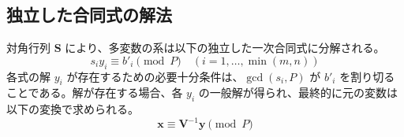 \documentclass[a4paper,11pt,dvipdfmx]{jsarticle}
\theoremstyle{definition}
\begin{document}
\subsection{独立した合同式の解法}
対角行列 $\mathbf{S}$ により、多変数の系は以下の独立した一次合同式に分解される。
\begin{equation}
    s_i y_i \equiv b'_i \pmod{P} \quad (i = 1, \dots, \min(m, n))
\end{equation}
各式の解 $y_i$ が存在するための必要十分条件は、$\gcd(s_i, P)$ が $b'_i$ を割り切ることである。解が存在する場合、各 $y_i$ の一般解が得られ、最終的に元の変数は以下の変換で求められる。
\begin{equation}
    \mathbf{x} \equiv \mathbf{V}^{-1} \mathbf{y} \pmod{P}
\end{equation}




\end{document}
